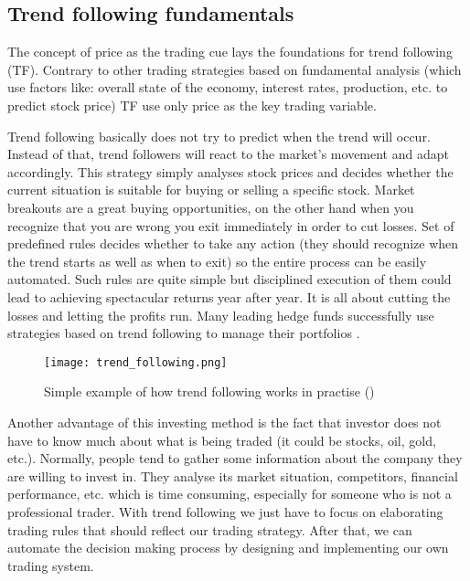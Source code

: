 \subsection{Trend following fundamentals}
\label{sec:trend_following_fundamentals}

The concept of price as the trading cue lays the foundations for trend following (TF). 
Contrary to other trading strategies based on fundamental analysis (which use factors like: overall state of the economy, interest rates, production, etc. to predict stock price)
TF use only price as the key trading variable. 

Trend following basically does not try to predict when the trend will occur. 
Instead of that, trend followers will react to the market's movement and adapt accordingly.
This strategy simply analyses stock prices and decides whether the current situation is suitable for buying or selling a specific stock.
Market breakouts are a great buying opportunities, on the other hand when you recognize that you are wrong you exit immediately in order to cut losses.
Set of predefined rules decides  whether to take any action (they should recognize when the trend starts as well as when to exit) so the entire process can be easily automated.
Such rules are quite simple but disciplined execution of them could lead to achieving spectacular returns year after year.
It is all about cutting the losses and letting the profits run.
Many leading hedge funds successfully use strategies based on trend following to manage their portfolios \cite{Trend01}.  

\begin{figure}[ht]
  \begin{center}
    \texttt{[image: trend\_following.png]}
  \end{center}
  \caption{Simple example of how trend following works in practise (\cite{Trend01})}
\end{figure}

Another advantage of this investing method is the fact that investor does not have to know much about what is being traded (it could be stocks, oil, gold, etc.).
Normally, people tend to gather some information about the company they are willing to invest in. 
They analyse its market situation, competitors, financial performance, etc. which is time consuming, especially for someone who is not a professional trader.
With trend following we just have to focus on elaborating trading rules that should reflect our trading strategy.
After that, we can automate the decision making process by designing and implementing our own trading system.   

